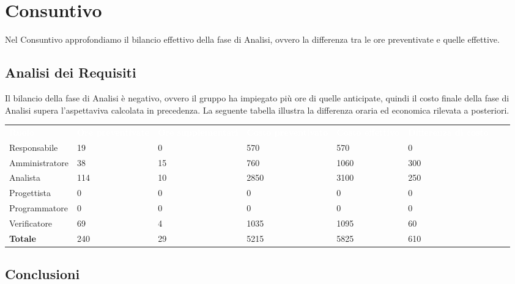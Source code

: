 \section{Consuntivo}

Nel Consuntivo approfondiamo il bilancio effettivo della fase di Analisi, ovvero la differenza tra le ore preventivate e quelle effettive.

\subsection{Analisi dei Requisiti}

Il bilancio della fase di Analisi è negativo, ovvero il gruppo ha impiegato più ore di quelle anticipate, quindi il costo finale della fase di Analisi supera l'aspettaviva calcolata in precedenza.
La seguente tabella illustra la differenza oraria ed economica rilevata a posteriori.

\renewcommand{\arraystretch}{2}
\centering
\begin{longtable}{ C{5cm} C{1cm} C{1cm} C{1cm} C{1cm} C{1cm} C{1cm} C{3cm}}
	\textcolor{white}{\textbf{Ruolo}} & \textcolor{white}{\textbf{Ore preventivate}} & \textcolor{white}{\textbf{Ore supplementari}} & \textcolor{white}{\textbf{Costo preventivato}} & \textcolor{white}{\textbf{Costo effettivo}} & \textcolor{white}{\textbf{Differenza di costo}}\\	
	
	Responsabile & 19 & 0 & 570 & 570 & 0 \\
	Amministratore & 38 & 15 & 760 & 1060 & 300 \\
	Analista & 114 & 10 & 2850 & 3100 & 250 \\
	Progettista & 0 & 0 & 0 & 0 & 0 \\
	Programmatore & 0 & 0 & 0 & 0 & 0 \\
	Verificatore & 69 & 4 & 1035 & 1095 & 60 \\
	\textbf{Totale} & 240 & 29 & 5215 & 5825 & 610 \\	
	
\end{longtable}

\subsection{Conclusioni}


